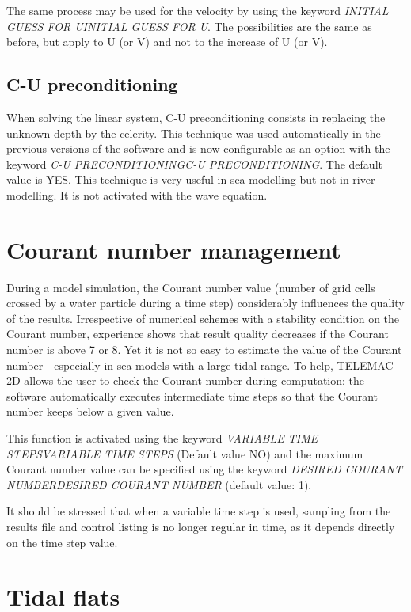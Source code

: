  The same process may be used for the velocity by using the keyword \textit{INITIAL GUESS FOR UINITIAL GUESS FOR U}. The possibilities are the same as before, but apply to U (or V) and not to the increase of U (or V).


\subsection{ C-U preconditioning}

 When solving the linear system, C-U preconditioning consists in replacing the unknown depth by the celerity. This technique was used automatically in the previous versions of the software and is now configurable as an option with the keyword \textit{C-U PRECONDITIONINGC-U PRECONDITIONING}. The default value is YES. This technique is very useful in sea modelling but not in river modelling. It is not activated with the wave equation.


\section{ Courant number management}

 During a model simulation, the Courant number value (number of grid cells crossed by a water particle during a time step) considerably influences the quality of the results. Irrespective of numerical schemes with a stability condition on the Courant number, experience shows that result quality decreases if the Courant number is above 7 or 8. Yet it is not so easy to estimate the value of the Courant number - especially in sea models with a large tidal range. To help, TELEMAC-2D allows the user to check the Courant number during computation: the software automatically executes intermediate time steps so that the Courant number keeps below a given value.

 This function is activated using the keyword \textit{VARIABLE TIME STEPSVARIABLE TIME STEPS} (Default value NO) and the maximum Courant number value can be specified using the keyword \textit{DESIRED COURANT NUMBERDESIRED COURANT NUMBER} (default value: 1).

 It should be stressed that when a variable time step is used, sampling from the results file and control listing is no longer regular in time, as it depends directly on the time step value.


\section{ Tidal flats}

